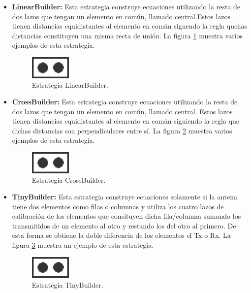 \begin{itemize}
	\item \textbf{LinearBuilder:} Esta estrategia construye ecuaciones utilizando la resta de dos lazos que tengan un elemento en 
		común, llamado central.Estos lazos tienen distancias equidistantes al elemento en común siguendo la regla quchas distancias
		constituyen una misma recta de unión. La figura \ref{fig:linealBuilder} muestra varios ejemplos de esta estrategia.
			
		\begin{figure}[H]
		 \centering
		 \includegraphics[width=2cm]{gfx/FrontAntenna2.png}
		 \caption{Estrategia LinearBuilder.}
		 \label{fig:linealBuilder}
		\end{figure}

	\item \textbf{CrossBuilder:} Esta estrategia construye ecuaciones utilizando la resta de dos lazos que tengan un elemento en 
		común, llamado central. Estos lazos tienen distancias equidistantes al elemento en común siguiendo la regla que dichas 
		distancias son perpendiculares entre sí. La figura \ref{fig:crossBuilder} muestra varios ejemplos de esta estrategia.
			
		\begin{figure}[H]
		 \centering
		 \includegraphics[width=2cm]{gfx/FrontAntenna2.png}
		 \caption{Estrategia CrossBuilder.}
		 \label{fig:crossBuilder}
		\end{figure}

	\item \textbf{TinyBuilder:} Esta estrategia construye ecuaciones solamente si la antena tiene dos elementos como filas o 
		columnas y utiliza los cuatro lazos de calibración de los elementos que consituyen dicha fila/columna sumando los 
		transmitidos de un elemento al otro y restando los del otro al primero. De esta forma se obtiene la doble diferencia de los 
		elementos el Tx o Rx. La figura \ref{fig:tinyBuilder} muestra un ejemplo de esta estrategia.
		
		\begin{figure}[H]
		 \centering
		 \includegraphics[width=2cm]{gfx/FrontAntenna2.png}
		 \caption{Estrategia TinyBuilder.}
		 \label{fig:tinyBuilder}
		\end{figure}


\end{itemize}
